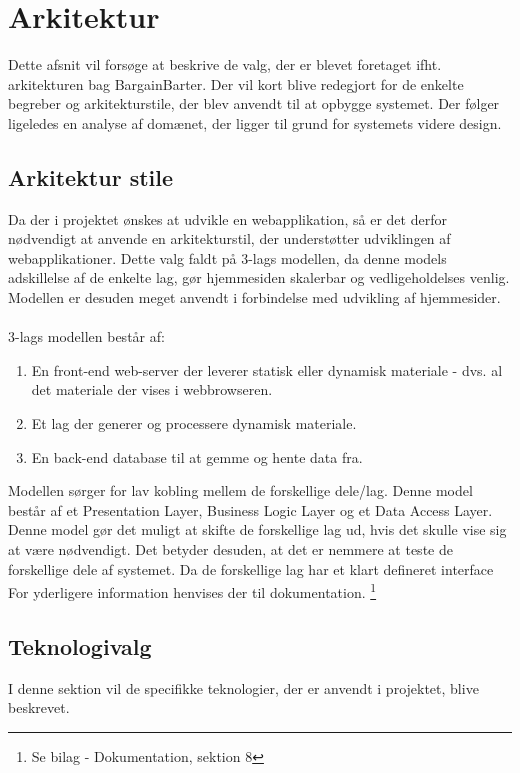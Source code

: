 \chapter{Arkitektur}
Dette afsnit vil forsøge at beskrive de valg, der er blevet foretaget ifht. arkitekturen bag BargainBarter. Der vil kort blive redegjort for de enkelte begreber og arkitekturstile, der blev anvendt til at opbygge systemet. Der følger ligeledes en analyse af domænet, der ligger til grund for systemets videre design.

\section{Arkitektur stile}
Da der i projektet ønskes at udvikle en webapplikation, så er det derfor nødvendigt at anvende en arkitekturstil, der understøtter udviklingen af webapplikationer.
Dette valg faldt på 3-lags modellen\cite{3-Layer}, da denne models adskillelse af de enkelte lag, gør hjemmesiden skalerbar og vedligeholdelses venlig. Modellen er desuden meget anvendt i forbindelse med udvikling af hjemmesider.\\ \\ 3-lags modellen består af:
\begin{enumerate}
	\item En front-end web-server der leverer statisk eller dynamisk materiale - dvs. al det materiale der vises i webbrowseren.
	\item Et lag der generer og processere dynamisk materiale.
	\item En back-end database til at gemme og hente data fra.
\end{enumerate}

\noindent Modellen sørger for lav kobling mellem de forskellige dele/lag. Denne model består af et Presentation Layer, Business Logic Layer og et Data Access Layer. Denne model gør det muligt at skifte de forskellige lag ud, hvis det skulle vise sig at være nødvendigt. Det betyder desuden, at det er nemmere at teste de forskellige dele af systemet. Da de forskellige lag har et klart defineret interface \\
For yderligere information henvises der til dokumentation. \footnote{Se bilag - Dokumentation, sektion 8}

\section{Teknologivalg}
I denne sektion vil de specifikke teknologier, der er anvendt i projektet, blive beskrevet.

